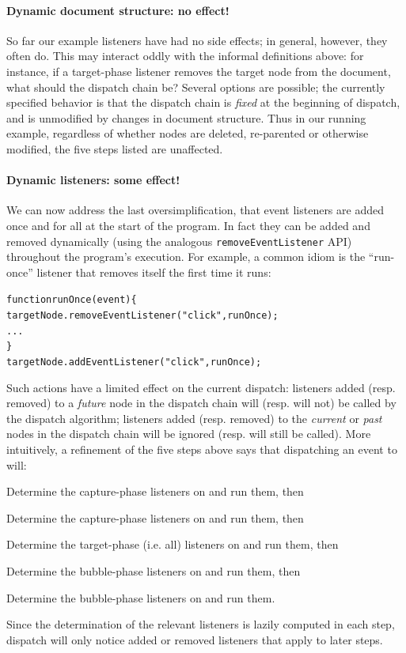 \documentclass[letterpaper,10pt,twocolumn]{article}
\newcommand{\quot}{\mbox{\tt\char'042}}
\newcommand{\wild}{\mbox{\tt\char'137}}
\newcommand{\impl}[1]{{\def\_{\wild}\def\"{\quot}\tt#1}}
\begin{document}
\paragraph{Dynamic document structure: no effect!}
So far our example listeners have had no side effects; in general,
however, they often do.  This may interact oddly with the informal
definitions above: for instance, if a target-phase listener removes
the target node from the document, what should the dispatch chain be?
Several options are possible; the currently specified behavior is that
the dispatch chain is \emph{fixed} at the beginning of dispatch, and
is unmodified by changes in document structure.  Thus in our running
example, regardless of whether nodes are deleted, re-parented or
otherwise modified, the five steps listed are unaffected.

\paragraph{Dynamic listeners: some effect!}
We can now address the last oversimplification, that event listeners
are added once and for all at the start of the program.  In fact they
can be added and removed dynamically (using the analogous
\impl{removeEventListener} API) throughout the program's execution.
For example, a common idiom is the ``run-once'' listener that removes
itself the first time it runs:
\begin{alltt}
  function runOnce(event) \{
    targetNode.removeEventListener("click", runOnce);
    ...
  \}
  targetNode.addEventListener("click", runOnce);
\end{alltt}

Such actions have a limited effect on the current dispatch: listeners
added (resp. removed) to a \emph{future} node in the dispatch chain
will (resp. will not) be called by the dispatch algorithm; listeners
added (resp. removed) to the \emph{current} or \emph{past} nodes in
the dispatch chain will be ignored (resp. will still be called).  More
intuitively, a refinement of the five steps above says that 
dispatching an event to  will:
\begin{compactitem}
\item Determine the capture-phase listeners on  and run
  them, then
\item Determine the capture-phase listeners on  and run
  them, then
\item Determine the target-phase (i.e. all) listeners on  and run
  them, then
\item Determine the bubble-phase listeners on  and run
  them, then
\item Determine the bubble-phase listeners on  and run
  them.
\end{compactitem}
Since the determination of the relevant listeners is lazily computed
in each step, dispatch will only notice added or removed listeners
that apply to later steps.
\end{document}
